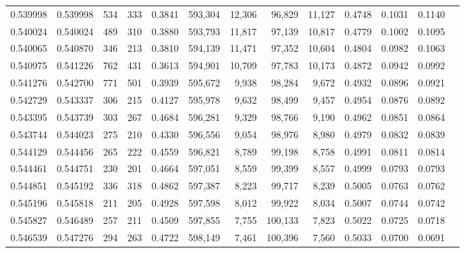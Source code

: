 \begin{tabular}{rrrrrrrrrrrrr}
0.539998 & 0.539998 &    534 &   333 &                                     0.3841 & 593,304 &  12,306 &  96,829 &  11,127 & 0.4748 & 0.1031 & 0.1140 \\
0.540024 & 0.540024 &    489 &   310 &                                     0.3880 & 593,793 &  11,817 &  97,139 &  10,817 & 0.4779 & 0.1002 & 0.1095 \\
0.540065 & 0.540870 &    346 &   213 &                                     0.3810 & 594,139 &  11,471 &  97,352 &  10,604 & 0.4804 & 0.0982 & 0.1063 \\
0.540975 & 0.541226 &    762 &   431 &                                     0.3613 & 594,901 &  10,709 &  97,783 &  10,173 & 0.4872 & 0.0942 & 0.0992 \\
0.541276 & 0.542700 &    771 &   501 &                                     0.3939 & 595,672 &   9,938 &  98,284 &   9,672 & 0.4932 & 0.0896 & 0.0921 \\
0.542729 & 0.543337 &    306 &   215 &                                     0.4127 & 595,978 &   9,632 &  98,499 &   9,457 & 0.4954 & 0.0876 & 0.0892 \\
0.543395 & 0.543739 &    303 &   267 &                                     0.4684 & 596,281 &   9,329 &  98,766 &   9,190 & 0.4962 & 0.0851 & 0.0864 \\
0.543744 & 0.544023 &    275 &   210 &                                     0.4330 & 596,556 &   9,054 &  98,976 &   8,980 & 0.4979 & 0.0832 & 0.0839 \\
0.544129 & 0.544456 &    265 &   222 &                                     0.4559 & 596,821 &   8,789 &  99,198 &   8,758 & 0.4991 & 0.0811 & 0.0814 \\
0.544461 & 0.544751 &    230 &   201 &                                     0.4664 & 597,051 &   8,559 &  99,399 &   8,557 & 0.4999 & 0.0793 & 0.0793 \\
0.544851 & 0.545192 &    336 &   318 &                                     0.4862 & 597,387 &   8,223 &  99,717 &   8,239 & 0.5005 & 0.0763 & 0.0762 \\
0.545196 & 0.545818 &    211 &   205 &                                     0.4928 & 597,598 &   8,012 &  99,922 &   8,034 & 0.5007 & 0.0744 & 0.0742 \\
0.545827 & 0.546489 &    257 &   211 &                                     0.4509 & 597,855 &   7,755 & 100,133 &   7,823 & 0.5022 & 0.0725 & 0.0718 \\
0.546539 & 0.547276 &    294 &   263 &                                     0.4722 & 598,149 &   7,461 & 100,396 &   7,560 & 0.5033 & 0.0700 & 0.0691 \\

\end{tabular}
